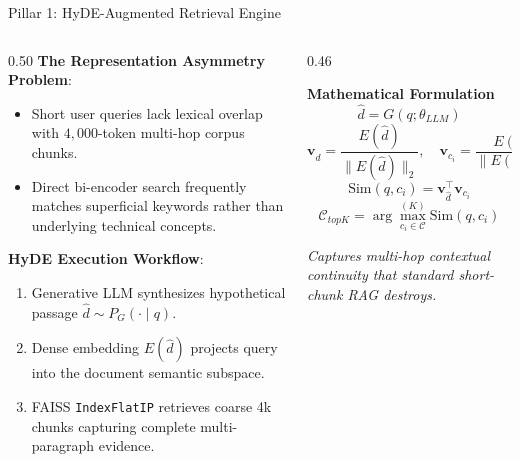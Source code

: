 \documentclass[10pt,aspectratio=169]{beamer}
\begin{document}
\begin{frame}{Pillar 1: HyDE-Augmented Retrieval Engine}
    \begin{columns}[onlytextwidth,T]
        \begin{column}{0.50\textwidth}
            \textbf{The Representation Asymmetry Problem}:
            \begin{itemize}
                \item Short user queries lack lexical overlap with $4,000$-token multi-hop corpus chunks.
                \item Direct bi-encoder search frequently matches superficial keywords rather than underlying technical concepts.
            \end{itemize}
            
            \vspace{0.15cm}
            \textbf{HyDE Execution Workflow}:
            \begin{enumerate}
                \item Generative LLM synthesizes hypothetical passage $\hat{d} \sim P_G(\cdot \mid q)$.
                \item Dense embedding $E(\hat{d})$ projects query into the document semantic subspace.
                \item FAISS \texttt{IndexFlatIP} retrieves coarse 4k chunks capturing complete multi-paragraph evidence.
            \end{enumerate}
        \end{column}
        
        \begin{column}{0.46\textwidth}
            \begin{exampleblock}{\textbf{Mathematical Formulation}}
                \footnotesize
                $$\hat{d} = G(q; \theta_{LLM})$$
                $$\mathbf{v}_{\hat{d}} = \frac{E(\hat{d})}{\|E(\hat{d})\|_2}, \quad \mathbf{v}_{c_i} = \frac{E(c_i)}{\|E(c_i)\|_2}$$
                $$\text{Sim}(q, c_i) = \mathbf{v}_{\hat{d}}^\top \mathbf{v}_{c_i}$$
                $$\mathcal{C}_{topK} = \arg\max_{c_i \in \mathcal{C}}^{(K)} \text{Sim}(q, c_i)$$
            \end{exampleblock}
            \vspace{0.1cm}
            \footnotesize \textit{Captures multi-hop contextual continuity that standard short-chunk RAG destroys.}
        \end{column}
    \end{columns}
\end{frame}
\end{document}
